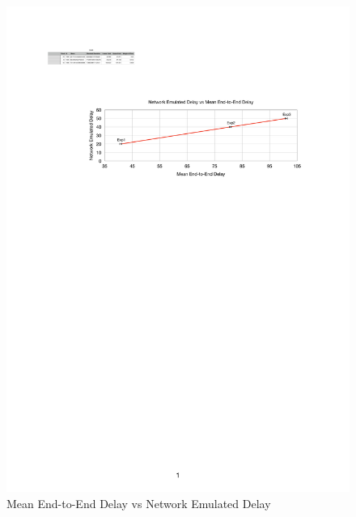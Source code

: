 \documentclass[conference]{IEEEtran}
\begin{document}
\begin{figure}[t]
\caption{Mean End-to-End Delay vs Network Emulated Delay}
\centerline{\includegraphics[width=\textwidth]{exps.pdf}}
\label{fig}
\end{figure}




\end{document}
